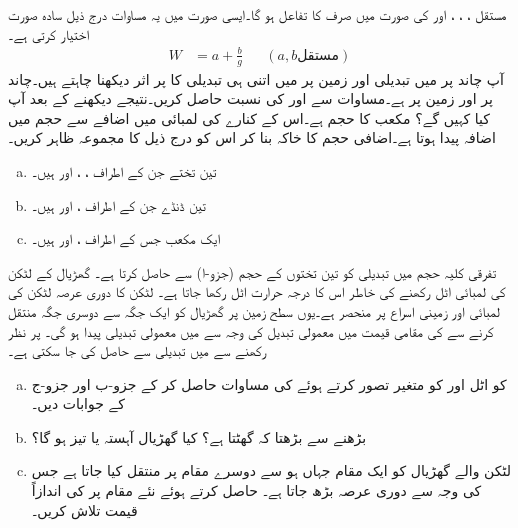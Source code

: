 مستقل ، ، ، اور  کی صورت میں  صرف  کا تفاعل ہو گا۔ایسی صورت میں یہ مساوات درج ذیل سادہ صورت اختیار کرتی ہے۔
\begin{align}\label{مساوات_استعمال_چاند}
W&=a+\frac{b}{g}&&(a,b \text{مستقل})
\end{align}  
آپ  چاند پر  میں تبدیلی  اور زمین پر  میں اتنی ہی  تبدیلی  کا  پر  اثر  دیکھنا چاہتے ہیں۔چاند پر  اور زمین پر  ہے۔مساوات  سے  اور  کی نسبت حاصل کریں۔نتیجے   دیکھنے کے بعد  آپ کیا کہیں گے؟
مکعب کا حجم  ہے۔اس کے کنارے کی لمبائی میں   اضافے  سے  حجم میں  اضافہ پیدا ہوتا ہے۔اضافی حجم  کا خاکہ بنا کر اس کو درج ذیل کا مجموعہ ظاہر کریں۔
\begin{enumerate}[a.]
\item
تین تختے جن کے اطراف ، ، اور  ہیں۔
\item
تین ڈنڈے جن کے اطراف ،  اور  ہیں۔
\item
ایک مکعب جس کے اطراف ،  اور  ہیں۔
\end{enumerate} 
تفرقی کلیہ   حجم میں تبدیلی کو تین تختوں کے حجم (جزو-ا) سے حاصل کرتا ہے۔
گھڑیال کے لٹکن کی لمبائی اٹل رکھنے کی خاطر اس کا درجہ حرارت  اٹل  رکھا جاتا ہے۔ لٹکن کا دوری عرصہ  لٹکن کی لمبائی  اور  زمینی  اسراع  پر منحصر ہے۔یوں سطح زمین پر گھڑیال کو ایک جگہ سے دوسری جگہ منتقل کرنے سے  کی مقامی قیمت میں معمولی تبدیل کی وجہ سے   میں معمولی تبدیلی پیدا ہو گی۔ پر نظر رکھنے سے  میں تبدیلی  سے حاصل کی جا سکتی ہے۔
\begin{enumerate}[a.]
\item
{} کو اٹل اور  کو متغیر تصور کرتے ہوئے  کی مساوات حاصل کر کے جزو-ب اور جزو-ج کے جوابات دیں۔ 
\item
{} بڑھنے سے  بڑھتا    کہ گھٹتا ہے؟ کیا گھڑیال  آہستہ یا تیز ہو گا؟
\item
{} لٹکن والے گھڑیال کو ایک مقام جہاں  ہو سے دوسرے مقام پر منتقل کیا جاتا ہے جس کی وجہ سے دوری عرصہ  بڑھ جاتا ہے۔ حاصل کرتے ہوئے نئے مقام پر  کی اندازاً قیمت  تلاش کریں۔
\end{enumerate}
